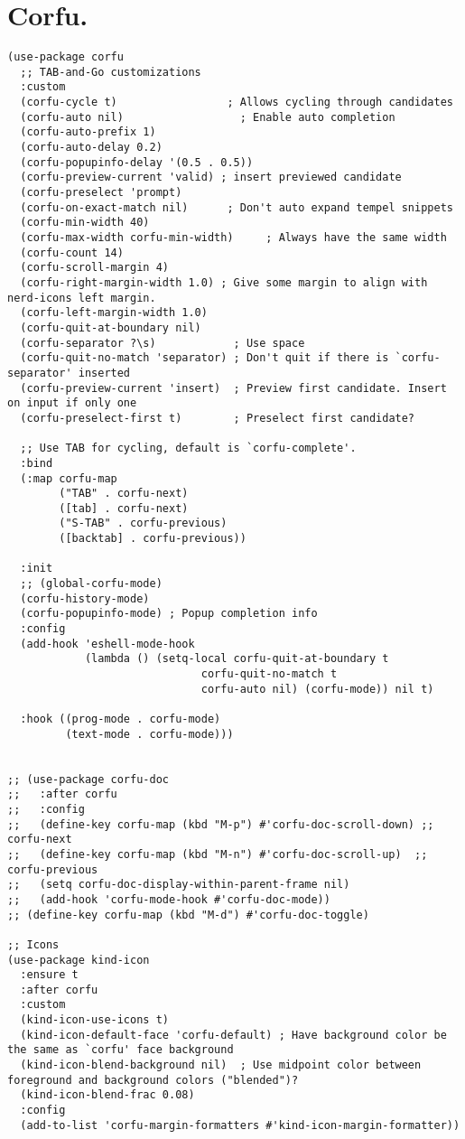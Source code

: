 \documentclass[11pt]{article}
\begin{document}
\section{Corfu.}
\label{sec:org28cb769}
\begin{verbatim}
(use-package corfu
  ;; TAB-and-Go customizations
  :custom
  (corfu-cycle t)                 ; Allows cycling through candidates
  (corfu-auto nil)                  ; Enable auto completion
  (corfu-auto-prefix 1)
  (corfu-auto-delay 0.2)
  (corfu-popupinfo-delay '(0.5 . 0.5))
  (corfu-preview-current 'valid) ; insert previewed candidate
  (corfu-preselect 'prompt)
  (corfu-on-exact-match nil)      ; Don't auto expand tempel snippets
  (corfu-min-width 40)
  (corfu-max-width corfu-min-width)     ; Always have the same width
  (corfu-count 14)
  (corfu-scroll-margin 4)
  (corfu-right-margin-width 1.0) ; Give some margin to align with nerd-icons left margin.
  (corfu-left-margin-width 1.0)
  (corfu-quit-at-boundary nil)
  (corfu-separator ?\s)            ; Use space
  (corfu-quit-no-match 'separator) ; Don't quit if there is `corfu-separator' inserted
  (corfu-preview-current 'insert)  ; Preview first candidate. Insert on input if only one
  (corfu-preselect-first t)        ; Preselect first candidate?

  ;; Use TAB for cycling, default is `corfu-complete'.
  :bind
  (:map corfu-map
        ("TAB" . corfu-next)
        ([tab] . corfu-next)
        ("S-TAB" . corfu-previous)
        ([backtab] . corfu-previous))

  :init
  ;; (global-corfu-mode)
  (corfu-history-mode)
  (corfu-popupinfo-mode) ; Popup completion info
  :config
  (add-hook 'eshell-mode-hook
            (lambda () (setq-local corfu-quit-at-boundary t
                              corfu-quit-no-match t
                              corfu-auto nil) (corfu-mode)) nil t)

  :hook ((prog-mode . corfu-mode)
         (text-mode . corfu-mode)))


;; (use-package corfu-doc
;;   :after corfu
;;   :config
;;   (define-key corfu-map (kbd "M-p") #'corfu-doc-scroll-down) ;; corfu-next
;;   (define-key corfu-map (kbd "M-n") #'corfu-doc-scroll-up)  ;; corfu-previous
;;   (setq corfu-doc-display-within-parent-frame nil)
;;   (add-hook 'corfu-mode-hook #'corfu-doc-mode))
;; (define-key corfu-map (kbd "M-d") #'corfu-doc-toggle)

;; Icons
(use-package kind-icon
  :ensure t
  :after corfu
  :custom
  (kind-icon-use-icons t)
  (kind-icon-default-face 'corfu-default) ; Have background color be the same as `corfu' face background
  (kind-icon-blend-background nil)  ; Use midpoint color between foreground and background colors ("blended")?
  (kind-icon-blend-frac 0.08)
  :config
  (add-to-list 'corfu-margin-formatters #'kind-icon-margin-formatter))


\end{verbatim}
\end{document}
